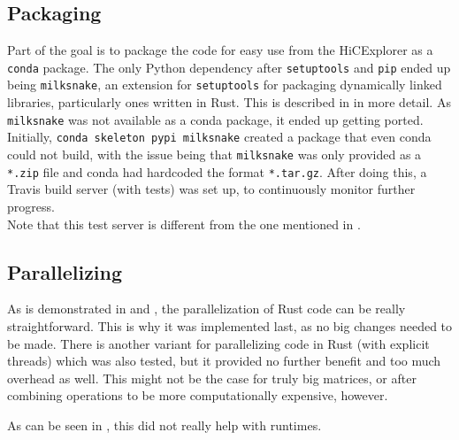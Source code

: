 \subsection{Packaging}


Part of the goal is to package the code for easy use from the HiCExplorer as a
\verb|conda| package. The only Python dependency after \verb|setuptools| and
\verb|pip| ended up being \verb|milksnake|, an extension for \verb|setuptools|
for packaging dynamically linked libraries, particularly ones written in Rust.
This is described in  in more detail. As
\verb|milksnake| was not available as a conda package, it ended up getting
ported. Initially, \verb|conda skeleton pypi milksnake| created a package that
even conda could not build, with the issue being that \verb|milksnake| was only
provided as a \verb|*.zip| file and conda had hardcoded the format
\verb|*.tar.gz|. After doing this, a Travis build server (with tests) was set
up, to continuously monitor further progress. \\
Note that this test server is different from the one mentioned in .


\subsection{Parallelizing}

As is demonstrated in  and , the parallelization of
Rust code can be really straightforward. This is why it was implemented last,
as no big changes needed to be made. There is another variant for parallelizing
code in Rust (with explicit threads) which was also tested, but it provided no
further benefit and too much overhead as well. This might not be the case for
truly big matrices, or after combining operations to be more computationally
expensive, however.

As can be seen in , this did not really help with
runtimes.
